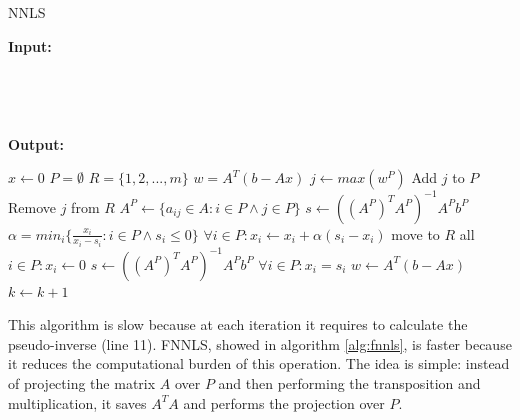 \begin{algorithm}[h]
  \begin{flushleft}
  \caption{NNLS}
  \label{alg:nnls}
  \textbf{Input:} \\
  \hspace*{\algorithmicindent} \\
  \hspace*{\algorithmicindent} \\
  \hspace*{\algorithmicindent}  \\
  \hspace*{\algorithmicindent}  \\
  \textbf{Output:} \\
  \hspace*{\algorithmicindent} 
  \end{flushleft}
  \begin{algorithmic}[1]
      \State $x \gets 0$
      \State $P=\emptyset$
      \State $R=\{ 1, 2, ..., m \}$
      \State $w=A^T(b - Ax)$ 
        \State $j \gets max(w^P)$ 
        \State Add $j$ to $P$
        \State Remove $j$ from $R$
        \State $A^P \gets  \{a_{ij} \in A : i \in P \land j \in P\}$
        \State $s \gets ((A^P)^T A^P)^{-1}A^P b^P$ 
          \State $\alpha=min_i\{\frac{x_i}{x_i-s_i} : i \in P \land s_i \leq 0 \}$
          \State $ \forall i \in P : x_i \gets x_i + \alpha (s_i - x_i)$
          \State move to $R$ all $i \in P : x_i \gets 0$
          \State $s \gets ((A^P)^T A^P)^{-1}A^P b^P$ 
          \EndWhile
        \State $\forall i \in P : x_i = s_i$
        \State $w \gets A^T(b - Ax)$
        \State $k \gets k+1$
      \EndWhile
    \EndFunction
  \end{algorithmic}
\end{algorithm}
This algorithm is slow because at each iteration it requires to calculate the pseudo-inverse (line 11). 
FNNLS, showed in algorithm \ref{alg:fnnls}, is faster because it reduces the computational burden of this operation. The idea is simple: instead of projecting the matrix $A$ over $P$ and then performing the transposition and multiplication, it saves $A^TA$ and performs the projection over $P$. 
